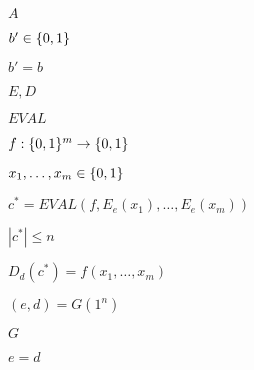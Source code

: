 \documentclass[10pt]{book}
\begin{document}
\begin{mdSnippets}
\begin{mdInlineSnippet}[7fc56270e7a70fa81a5935b72eacbe29]
$A$\end{mdInlineSnippet}%
\begin{mdInlineSnippet}[b3451e424de6ff5841f9775a7e9646db]%
$b'\in\{0,1\}$\end{mdInlineSnippet}%
\begin{mdInlineSnippet}%
$b'=b$\end{mdInlineSnippet}%
\begin{mdInlineSnippet}%
$E,D$\end{mdInlineSnippet}%
\begin{mdInlineSnippet}[1f8cb46fe06733d6f0dd650117e6ab66]%
$EVAL$\end{mdInlineSnippet}%
\begin{mdInlineSnippet}[5daeb1b496581a385348153d344ce94d]%
$f:\{0,1\}^m\rightarrow\{0,1\}$\end{mdInlineSnippet}%
\begin{mdInlineSnippet}[2678ad97fe7659742f79c4f421704238]%
$x_1,\ldots,x_m \in \{0,1\}$\end{mdInlineSnippet}%
\begin{mdInlineSnippet}%
$c^* = EVAL(f,E_e(x_1),\ldots,E_e(x_m))$\end{mdInlineSnippet}%
\begin{mdInlineSnippet}[cc3ceb08039d5d79d573a859a28c0d85]%
$|c^*|\leq n$\end{mdInlineSnippet}%
\begin{mdInlineSnippet}[9e563728875e8d5c0d55b31dfeb0d5f2]%
$D_d(c^*)=f(x_1,\ldots,x_m)$\end{mdInlineSnippet}%
\begin{mdInlineSnippet}%
$(e,d)=G(1^n)$\end{mdInlineSnippet}%
\begin{mdInlineSnippet}[dfcf28d0734569a6a693bc8194de62bf]%
$G$\end{mdInlineSnippet}%
\begin{mdInlineSnippet}[fedb6fe5856c97ed834b8f73784654f1]%
$e=d$\end{mdInlineSnippet}%
\begin{mdInlineSnippet}[5867c9b098884eca2779f6d98d4b0b29]%

\end{mdInlineSnippet}
\end{mdSnippets}
\end{document}
